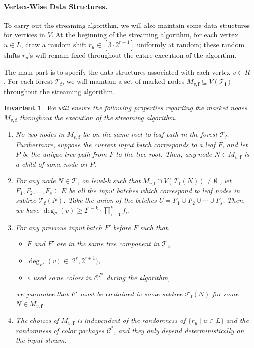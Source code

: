 \documentclass[11pt,a4paper]{article}
\newtheorem{invariant}{Invariant}[section]
\newcommand{\tree}{\mathcal{T}}
\newcommand{\freq}{\mathbf{f}}
\newcommand{\clr}{\mathcal{C}}
\begin{document}
\paragraph*{Vertex-Wise Data Structures.} To carry out the streaming algorithm, we will also maintain some data structures for vertices in $V$. At the beginning of the streaming algorithm, for each vertex $u\in L$, draw a random shift $r_u\in [3\cdot 2^{r+1}]$ uniformly at random; these random shifts $r_u$'s will remain fixed throughout the entire execution of the algorithm.

The main part is to specify the data structures associated with each vertex $v\in R$. For each forest $\tree_\freq$, we will maintain a set of marked nodes $M_{v, \freq}\subseteq V(\tree_\freq)$ throughout the streaming algorithm.
\begin{invariant}\label{inv}
	We will ensure the following properties regarding the marked nodes $M_{v, \freq}$ throughout the execution of the streaming algorithm.
	\begin{enumerate}[(1)]
		\item No two nodes in $M_{v, \freq}$ lie on the same root-to-leaf path in the forest $\tree_{\freq}$. Furthermore, suppose the current input batch corresponds to a leaf $F$, and let $P$ be the unique tree path from $F$ to the tree root. Then, any node $N\in M_{v, \freq}$ is a child of some node on $P$.
		
		\item For any node $N\in \tree_\freq$ on level-$k$ such that $M_{v, \freq}\cap V(\tree_\freq(N))\neq \emptyset$ , let $F_1, F_2, \ldots, F_s\subseteq E$ be all the input batches which correspond to leaf nodes in subtree $\tree_\freq(N)$. Take the union of the batches $U = F_1\cup F_2\cup\cdots \cup F_s$. Then, we have $\deg_U(v)\geq 2^{r-k}\cdot\prod_{i = 1}^k f_i$.
		
		\item For any previous input batch $F'$ before $F$ such that:
		\begin{itemize}
			\item $F$ and $F'$ are in the same tree component in $\tree_\freq$,
			\item $\deg_{F'}(v)\in [2^r, 2^{r+1})$,
			\item $v$ used some colors in $\clr^{F'}$ during the algorithm,
		\end{itemize} 
		we guarantee that $F'$ must be contained in some subtree $\tree_{\freq}(N)$ for some $N\in M_{v, \freq}$.
		
		\item The choices of $M_{v, \freq}$ is independent of the randomness of $\{r_u\mid u\in L\}$ and the randomness of color packages $\clr^*$, and they only depend deterministically on the input stream.
	\end{enumerate}
\end{invariant}
\end{document}
